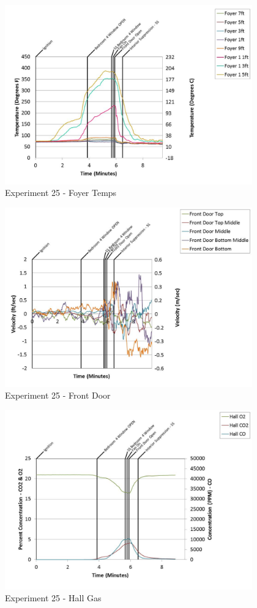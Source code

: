 \documentclass{article}
\begin{document}
\begin{appendices}
	\begin{figure}[h!]
		\centering
		\includegraphics[height=3.05in]{0_Images/Results_Charts/Exp_25_Charts/FoyerTemps.pdf}
		\caption{Experiment 25 - Foyer Temps}
	\end{figure}
 
	\clearpage

	\begin{figure}[h!]
		\centering
		\includegraphics[height=3.05in]{0_Images/Results_Charts/Exp_25_Charts/FrontDoor.pdf}
		\caption{Experiment 25 - Front Door}
	\end{figure}
 

	\begin{figure}[h!]
		\centering
		\includegraphics[height=3.05in]{0_Images/Results_Charts/Exp_25_Charts/HallGas.pdf}
		\caption{Experiment 25 - Hall Gas}
	\end{figure}
 

\end{appendices}
\end{document}
